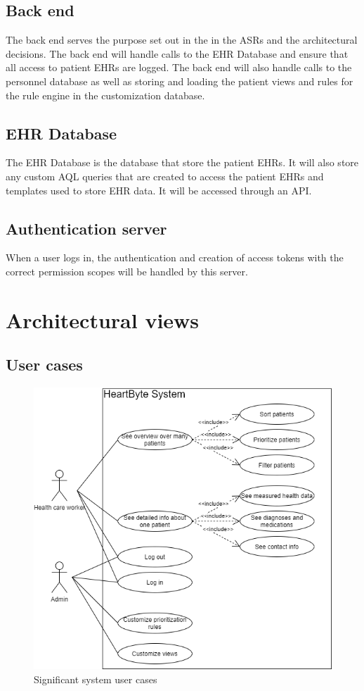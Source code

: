 \documentclass{article}
\begin{document}
\subsection{Back end}
The back end serves the purpose set out in the in the ASRs and the architectural decisions. The back end will handle calls to the EHR Database and ensure that all access to patient EHRs are logged. The back end will also handle calls to the personnel database as well as storing and loading the patient views and rules for the rule engine in the customization database.

\subsection{EHR Database}
The EHR Database is the database that store the patient EHRs. It will also store any custom AQL queries that are created to access the patient EHRs and templates used to store EHR data. It will be accessed through an API.

\subsection{Authentication server}
When a user logs in, the authentication and creation of access tokens with the correct permission scopes will be handled by this server.


\section{Architectural views}
\subsection{User cases}
\begin{figure}[h]
    \centering
    \includegraphics[scale = 0.5]{user-cases}
    \caption{Significant system user cases}
    \label{fig:user-cases}
\end{figure}
\end{document}
